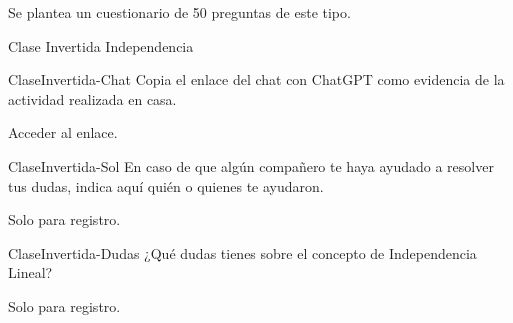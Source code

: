 \documentclass[a4,11pt]{aleph-notas}
\begin{document}
Se plantea un cuestionario de 50 preguntas de este tipo.


\begin{quiz}{Clase Invertida Independencia}
    
\begin{essay}[response format=text, response field lines=5]%
    {ClaseInvertida-Chat}
    Copia el enlace del chat con ChatGPT como evidencia de la actividad realizada en casa.
    \item Acceder al enlace.
\end{essay}

\begin{essay}[response format=text, response field lines=5]%
    {ClaseInvertida-Sol}
    En caso de que algún compañero te haya ayudado a resolver tus dudas, indica aquí quién o quienes te ayudaron.
    \item Solo para registro.
\end{essay}

\begin{essay}[response format=text, response field lines=5]%
    {ClaseInvertida-Dudas}
    ¿Qué dudas tienes sobre el concepto de Independencia Lineal?
    \item Solo para registro.
\end{essay}



\end{quiz}
\end{document}
